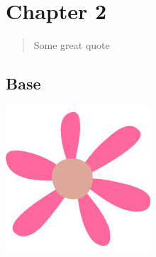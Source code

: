 \documentclass[../book/latex-book.tex]{subfiles}
\begin{document}
\chapter{Chapter 2}
\begin{quote}
Some great quote
\end{quote}
\section{Base}

\begin{center}
  \includegraphics{images/flower1.jpeg}
\end{center}
\end{document}
